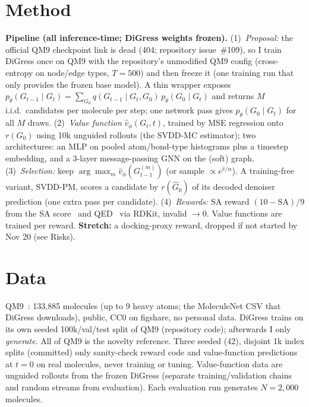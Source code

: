 \documentclass[10pt]{article}
\newcommand{\Gt}{G_t}
\begin{document}
\section{Method}
\textbf{Pipeline (all inference-time; DiGress weights frozen).} (1)~\emph{Proposal:} the official QM9 checkpoint link is dead (404; repository issue~\#109), so I train DiGress once on QM9 with the repository's unmodified QM9 config (cross-entropy on node/edge types, $T{=}500$) and then freeze it (one training run that only provides the frozen base model). A thin wrapper exposes $p_\theta(G_{t-1}\mid\Gt)=\sum_{G_0}q(G_{t-1}\mid\Gt,G_0)\,p_\theta(G_0\mid\Gt)$ and returns $M$ i.i.d.\ candidates per molecule per step; one network pass gives $p_\theta(G_0\mid\Gt)$ for all $M$ draws. (2)~\emph{Value function} $\hat v_\phi(\Gt,t)$, trained by MSE regression onto $r(G_0)$ using 10k unguided rollouts (the SVDD-MC estimator); two architectures: an MLP on pooled atom/bond-type histograms plus a timestep embedding, and a 3-layer message-passing GNN on the (soft) graph. (3)~\emph{Selection:} keep $\arg\max_m \hat v_\phi(G_{t-1}^{(m)})$ (or sample $\propto e^{\hat v/\alpha}$). A training-free variant, SVDD-PM, scores a candidate by $r(\hat G_0)$ of its decoded denoiser prediction (one extra pass per candidate). (4)~\emph{Rewards:} SA reward $(10-\mathrm{SA})/9$ from the SA score~\cite{ertl2009sa} and QED~\cite{bickerton2012qed} via RDKit, invalid $\to 0$. Value functions are trained per reward. \textbf{Stretch:} a docking-proxy reward, dropped if not started by Nov 20 (see Risks).

\section{Data}
QM9~\cite{ramakrishnan2014qm9}: 133{,}885 molecules (up to 9 heavy atoms; the MoleculeNet CSV that DiGress downloads), public, CC0 on figshare, no personal data. DiGress trains on its own seeded 100k/val/test split of QM9 (repository code); afterwards I only \emph{generate}. All of QM9 is the novelty reference. Three seeded (42), disjoint 1k index splits (committed) only sanity-check reward code and value-function predictions at $t{=}0$ on real molecules, never training or tuning. Value-function data are unguided rollouts from the frozen DiGress (separate training/validation chains and random streams from evaluation). Each evaluation run generates $N{=}2{,}000$ molecules.
\end{document}
